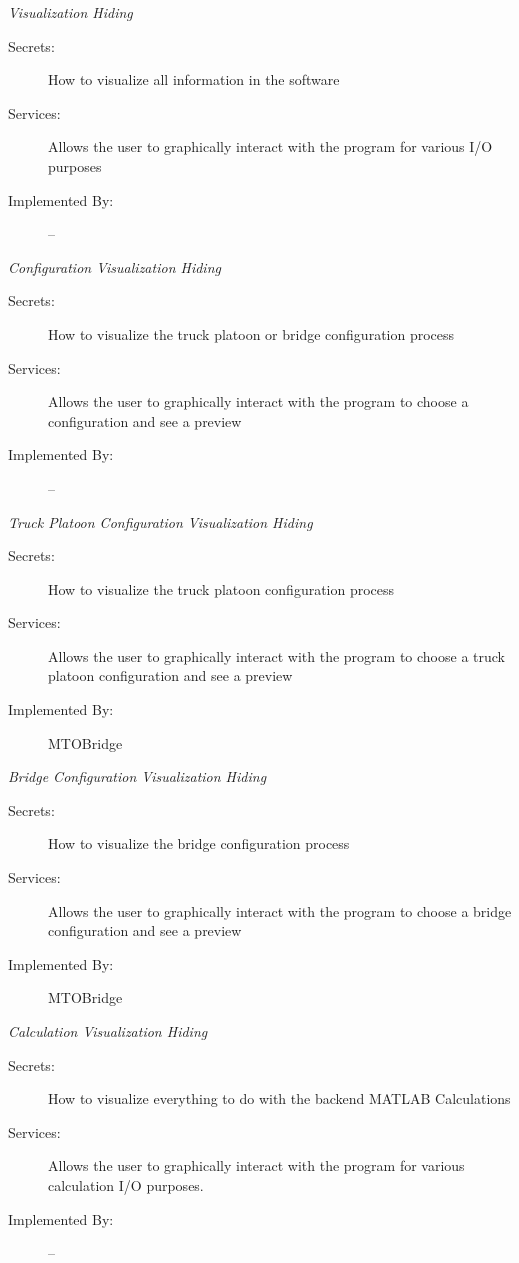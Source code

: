 \documentclass[12pt, titlepage]{article}
\begin{document}
    \emph{{\large Visualization Hiding}}
    \begin{description}
        \item[Secrets:]How to visualize all information in the software
        \item[Services:]Allows the user to graphically interact with the program for various I/O purposes
        \item[Implemented By:] --\\
    \end{description}
    \emph{{\large Configuration Visualization Hiding}}
    \begin{description}
        \item[Secrets:]How to visualize the truck platoon or bridge configuration process
        \item[Services:]Allows the user to graphically interact with the program to choose a configuration and see a preview
        \item[Implemented By:] --\\
    \end{description}
    \emph{{\large Truck Platoon Configuration Visualization Hiding}}
    \begin{description}
        \item[Secrets:]How to visualize the truck platoon configuration process
        \item[Services:]Allows the user to graphically interact with the program to choose a truck platoon configuration and see a preview
        \item[Implemented By:] MTOBridge\\
    \end{description}
    \emph{{\large Bridge Configuration Visualization Hiding}}
    \begin{description}
        \item[Secrets:]How to visualize the bridge configuration process
        \item[Services:]Allows the user to graphically interact with the program to choose a bridge configuration and see a preview
        \item[Implemented By:] MTOBridge\\
    \end{description}
    \emph{{\large Calculation Visualization Hiding}}
    \begin{description}
        \item[Secrets:]How to visualize everything to do with the backend MATLAB Calculations
        \item[Services:]Allows the user to graphically interact with the program for various calculation I/O purposes.
        \item[Implemented By:] --\\
    \end{description}
\end{document}
